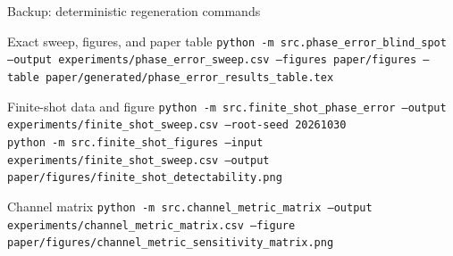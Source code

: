 \documentclass[10pt,aspectratio=169]{beamer}
\newcommand{\sourcefoot}[1]{}
\begin{document}
\begin{frame}[t]{Backup: deterministic regeneration commands}
\small
\begin{block}{Exact sweep, figures, and paper table}
\texttt{python -m src.phase\_error\_blind\_spot --output experiments/phase\_error\_sweep.csv --figures paper/figures --table paper/generated/phase\_error\_results\_table.tex}
\end{block}
\begin{block}{Finite-shot data and figure}
\texttt{python -m src.finite\_shot\_phase\_error --output experiments/finite\_shot\_sweep.csv --root-seed 20261030}\\[1mm]
\texttt{python -m src.finite\_shot\_figures --input experiments/finite\_shot\_sweep.csv --output paper/figures/finite\_shot\_detectability.png}
\end{block}
\begin{block}{Channel matrix}
\texttt{python -m src.channel\_metric\_matrix --output experiments/channel\_metric\_matrix.csv --figure paper/figures/channel\_metric\_sensitivity\_matrix.png}
\end{block}
\sourcefoot{CI verifies the deterministic CSV and generated table artifacts.}
\end{frame}
\end{document}
